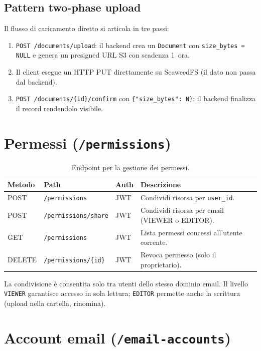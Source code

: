\subsection{Pattern two-phase upload}

Il flusso di caricamento diretto si articola in tre passi:
\begin{enumerate}[leftmargin=*]
    \item \texttt{POST /documents/upload}: il backend crea un \texttt{Document} con
          \texttt{size\_bytes = NULL} e genera un presigned URL S3 con scadenza 1~ora.
    \item Il client esegue un HTTP PUT direttamente su SeaweedFS (il dato non passa dal backend).
    \item \texttt{POST /documents/\{id\}/confirm} con \texttt{\{"size\_bytes": N\}}:
          il backend finalizza il record rendendolo visibile.
\end{enumerate}

\section{Permessi (\texttt{/permissions})}
\label{sec:api_permissions}

\begin{table}[ht]
\centering
\small
\begin{tabularx}{\linewidth}{l l l X}
\toprule
\textbf{Metodo} & \textbf{Path} & \textbf{Auth} & \textbf{Descrizione} \\
\midrule
POST   & \texttt{/permissions}        & JWT & Condividi risorsa per \texttt{user\_id}. \\
POST   & \texttt{/permissions/share}  & JWT & Condividi risorsa per email (VIEWER o EDITOR). \\
GET    & \texttt{/permissions}        & JWT & Lista permessi concessi all'utente corrente. \\
DELETE & \texttt{/permissions/\{id\}} & JWT & Revoca permesso (solo il proprietario). \\
\bottomrule
\end{tabularx}
\caption{Endpoint per la gestione dei permessi.}
\end{table}

La condivisione \`e consentita solo tra utenti dello stesso dominio email. Il livello
\texttt{VIEWER} garantisce accesso in sola lettura; \texttt{EDITOR} permette anche la
scrittura (upload nella cartella, rinomina).

\section{Account email (\texttt{/email-accounts})}
\label{sec:api_email}


